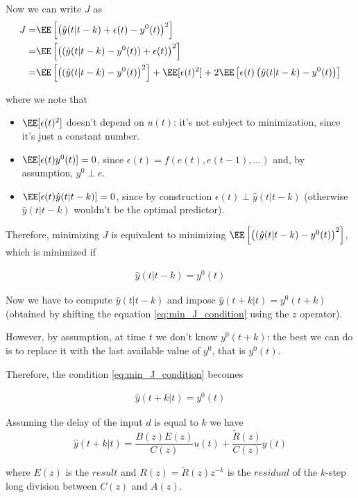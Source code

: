 Now we can write $J$ as 
\begin{align*}
	J =& \EE\left[ \left( \hat{y}(t|t-k) + \epsilon(t) - y^0(t) \right)^2 \right] \\
	  =& \EE\left[ \left( (\hat{y}(t|t-k) - y^0(t)) + \epsilon(t) \right)^2 \right] \\
	  =& \EE\left[ \left( (\hat{y}(t|t-k) - y^0(t) \right)^2 \right] + \EE[\epsilon(t)^2 ] + 2 \EE\left[ \epsilon(t) \left( \hat{y}(t|t-k) - y^0(t) \right) \right] 
\end{align*}

where we note that

\begin{itemize}
	\item $\EE[\epsilon(t)^2 ]$ doesn't depend on $u(t)$: it's not subject to minimization, since it's just a constant number.
	\item $\EE[ \epsilon(t) y^0(t) ] = 0$, since $\epsilon(t) = f(e(t), e(t-1), \dots) $ and, by assumption, $y^0 \perp e$.
	\item $\EE[ \epsilon(t) \hat{y}(t|t-k) ] = 0$, since by construction $\epsilon(t) \perp \hat{y}(t|t-k)$ (otherwise $\hat{y}(t|t-k)$ wouldn't be the optimal predictor).
\end{itemize}

Therefore, minimizing $J$ is equivalent to minimizing  $\EE\left[ \left( (\hat{y}(t|t-k) - y^0(t) \right)^2 \right]$, which is minimized if

\begin{align}\label{eq:min_J_condition}
	\hat{y}(t|t-k) = y^0(t)
\end{align}

Now we have to compute $\hat{y}(t|t-k)$ and impose $\hat{y}(t+k|t) = y^0(t+k)$ (obtained by shifting the equation \ref{eq:min_J_condition} using the $z$ operator).

However, by assumption, at time $t$ we don't know $y^0(t+k)$: the best we can do is to replace it with the last available value of $y^0$, that is $y^0(t)$.

Therefore, the condition \ref{eq:min_J_condition} becomes 

\begin{align}\label{eq:new_min_J_condition}
	\hat{y}(t+k|t) = y^0(t)
\end{align}

\begin{rem}
    Assuming the delay of the input $d$ is equal to $k$ we have
	\[
		\hat{y}(t+k|t) = \frac{B(z) E(z)}{C(z)} u(t) + \frac{\tilde{R}(z)}{C(z)} y(t)
	\] 

	where $E(z)$ is the $result$ and $R(z) = \tilde{R}(z) z^{-k}$ is the $residual$ of the $k$-step long division between $C(z)$ and $A(z)$.

\end{rem}

